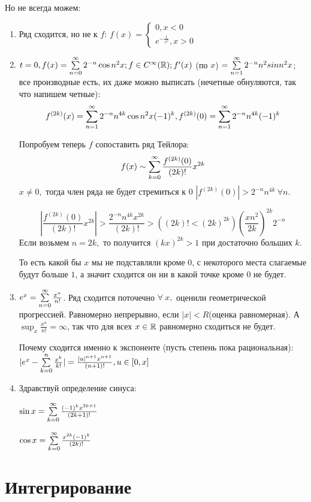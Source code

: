 \documentclass[12pt]{report}
\begin{document}
Но не всегда можем:
\begin{enumerate}
\item Ряд сходится, но не к $f$: $f(x) = \left\{\begin{matrix}
0, x < 0\\
e^{-\frac{1}{x^2}}, x > 0
\end{matrix}\right.
$

\item $t = 0, f(x) = \sum\limits_{n = 0}^\infty{2^{-n}\cos{n^2 x}}; f \in C^\infty(\mathbb{R}); f'(x)$ (по $x$) $ = \sum\limits_{n = 1}^\infty{2^{-n}n^2sin{n^2 x}}$; все производные есть, их даже можно выписать (нечетные обнуляются, так что напишем четные):
$$f^{(2k)}(x) = \sum\limits_{n = 1}^\infty{2^{-n}n^{4k}\cos{n^2 x}(-1)^k}, f^{(2k)}(0) = \sum\limits_{n = 1}^\infty{2^{-n}n^{4k}(-1)^k}$$

Попробуем теперь $f$ сопоставить ряд Тейлора:
$$f(x) \sim \sum\limits_{k = 0}^\infty{\frac{f^{(2k)}(0)}{(2k)!}x^{2k}}$$
$x \neq 0,$ тогда член ряда не будет стремиться к $0$ $|f^{(2k)}(0)| > 2^{-n}n^{4k} ~\forall n$. 

$$\left|\frac{f^{(2k)}(0)}{(2k)!}x^{2k}\right| > \frac{2^{-n}n^{4k}x^{2k}}{(2k)!} > ((2k)! < (2k)^{2k}) \left(\frac{x n^2}{2k}\right)^{2k} 2^{-n}$$
Если возьмем $n = 2k,$ то получится $(kx)^{2k} > 1$ при достаточно больших $k$.

То есть какой бы $x$ мы не подставляли кроме $0$, с некоторого места слагаемые будут больше $1$, а значит сходится он ни в какой точке кроме $0$ не будет.

\item $e^x = \sum\limits_{n = 0}^\infty{\frac{x^n}{n!}}$. Ряд сходится поточечно $\forall ~x,$ оценили геометрической прогрессией. Равномерно непрерывно, если $|x| < R$(оценка равномерная). А $\sup_{x}{\frac{x^n}{n!}} = \infty$, так что для всех $x \in \mathbb{R}$ равномерно сходиться не будет.

Почему сходится именно к экспоненте (пусть степень пока рациональная): $|e^x - \sum\limits_{k = 0}^n{\frac{x^k}{k!}}| = \frac{|u|^{n + 1}x^{n + 1}}{(n + 1)!}, u \in [0, x]$

\item Здравствуй определение синуса:

$\sin{x} = \sum\limits_{k = 0}^\infty{\frac{(-1)^k x^{2k + 1}}{(2k + 1)!}}$

$\cos{x} = \sum\limits_{k = 0}^\infty{\frac{x^{2k}(-1)^k}{(2k)!}}$
\end{enumerate}

\chapter{Интегрирование}
\end{document}
